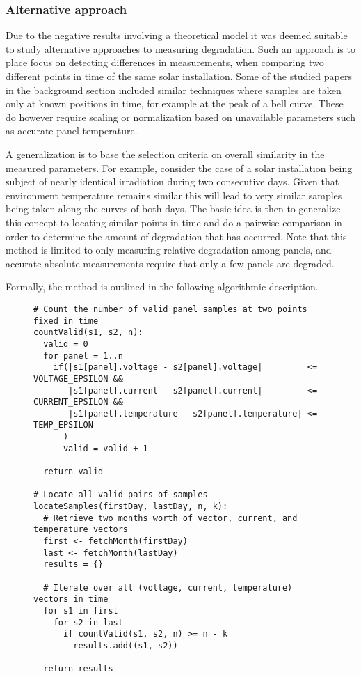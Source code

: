 \subsubsection{Alternative approach}
Due to the negative results involving a theoretical model it was deemed suitable to study alternative approaches to measuring degradation.
Such an approach is to place focus on detecting differences in measurements, when comparing two different points in time of the same solar installation.
Some of the studied papers in the background section included similar techniques where samples are taken only at known positions in time, for example at the peak of a bell curve.
These do however require scaling or normalization based on unavailable parameters such as accurate panel temperature.

A generalization is to base the selection criteria on overall similarity in the measured parameters.
For example, consider the case of a solar installation being subject of nearly identical irradiation during two consecutive days.
Given that environment temperature remains similar this will lead to very similar samples being taken along the curves of both days.
The basic idea is then to generalize this concept to locating similar points in time and do a pairwise comparison in order to determine the amount of degradation that has occurred.
Note that this method is limited to only measuring relative degradation among panels, and accurate absolute measurements require that only a few panels are degraded.

Formally, the method is outlined in the following algorithmic description.

\begin{figure}[H]
\begin{verbatim}
# Count the number of valid panel samples at two points fixed in time
countValid(s1, s2, n):
  valid = 0
  for panel = 1..n
    if(|s1[panel].voltage - s2[panel].voltage|         <= VOLTAGE_EPSILON &&
       |s1[panel].current - s2[panel].current|         <= CURRENT_EPSILON &&
       |s1[panel].temperature - s2[panel].temperature| <= TEMP_EPSILON
      )
      valid = valid + 1

  return valid

# Locate all valid pairs of samples
locateSamples(firstDay, lastDay, n, k):
  # Retrieve two months worth of vector, current, and temperature vectors
  first <- fetchMonth(firstDay)
  last <- fetchMonth(lastDay)
  results = {}

  # Iterate over all (voltage, current, temperature) vectors in time
  for s1 in first
    for s2 in last
      if countValid(s1, s2, n) >= n - k
        results.add((s1, s2))

  return results
\end{verbatim}
\end{figure}

